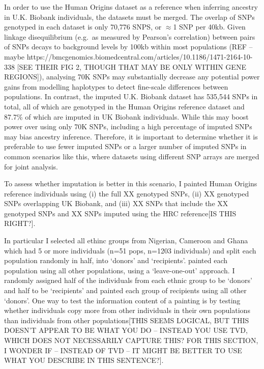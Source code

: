 In order to use the Human Origins dataset as a reference when inferring ancestry in U.K. Biobank individuals, the datasets must be merged. The overlap of SNPs genotyped in each dataset is only 70,776 SNPS, or $\approx$1 SNP per 40kb. Given linkage disequilibrium (e.g.\ as measured by Pearson's correlation) between pairs of SNPs decays to background levels by 100kb within most populations (REF -- maybe https://bmcgenomics.biomedcentral.com/articles/10.1186/1471-2164-10-338 [SEE THEIR FIG 2, THOUGH THAT MAY BE ONLY WITHIN GENE REGIONS]), analysing 70K SNPs may substantially decrease any potential power gains from modelling haplotypes to detect fine-scale differences between populations. In contrast, the imputed U.K. Biobank dataset has 535,544 SNPs in total, all of which are genotyped in the Human Origins reference dataset and 87.7\% of which are imputed in UK Biobank individuals. While this may boost power over using only 70K SNPs, including a high percentage of imputed SNPs may bias ancestry inference. Therefore, it is important to determine whether it is preferable to use fewer imputed SNPs or a larger number of imputed SNPs in common scenarios like this, where datasets using different SNP arrays are merged for joint analysis.

To assess whether imputation is better in this scenario, I painted Human Origins reference individuals using (i) the full XX genotyped SNPs, (ii) XX genotyped SNPs overlapping UK Biobank, and (iii) XX SNPs that include the XX genotyped SNPs and XX SNPs imputed using the HRC reference[IS THIS RIGHT?]. 

In particular I selected all ethinc groups from Nigerian, Cameroon and Ghana which had 5 or more individuals (n=51 pops, n=1203 individuals) and split each population randomly in half, into `donors' and `recipients'. painted each population using all other populations, using a `leave-one-out' approach. I randomly assigned half of the individuals from each ethnic group to be `donors' and half to be `recipients' and painted each group of recipients using all other `donors'. One way to test the information content of a painting is by testing whether individuals copy more from other individuals in their own populations than individuals from other populations[THIS SEEMS LOGICAL, BUT THIS DOESN'T APPEAR TO BE WHAT YOU DO -- INSTEAD YOU USE TVD, WHICH DOES NOT NECESSARILY CAPTURE THIS? FOR THIS SECTION, I WONDER IF -- INSTEAD OF TVD -- IT MIGHT BE BETTER TO USE WHAT YOU DESCRIBE IN THIS SENTENCE?]. 

